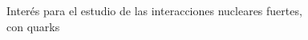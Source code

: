 \documentclass[preview]{standalone}
\begin{document}
\begin{center}
Interés para el estudio de las interacciones nucleares fuertes, \\con quarks
\end{center}
\end{document}
